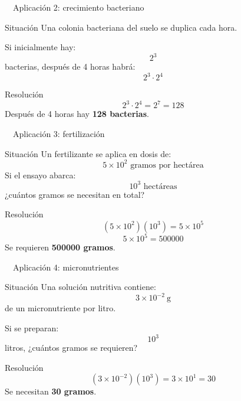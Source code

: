 \documentclass[aspectratio=169,10pt,handout]{beamer}
\newcommand{\pp}{\pause}
\newcommand{\iconoAgro}{\faSeedling}
\begin{document}
	\begin{frame}{\iconoAgro\ \ Aplicación 2: crecimiento bacteriano}
		\begin{block}{Situación}
			Una colonia bacteriana del suelo se duplica cada hora.
			
			Si inicialmente hay:
			\[
			2^3
			\]
			bacterias, después de 4 horas habrá:
			\[
			2^3\cdot2^4
			\]
		\end{block}
		
		\pp
		
		\begin{exampleblock}{Resolución}
			\[
			2^3\cdot2^4 = 2^{7}=128
			\]
			Después de 4 horas hay \textbf{128 bacterias}.
		\end{exampleblock}
	\end{frame}
	
	\begin{frame}{\iconoAgro\ \ Aplicación 3: fertilización}
		\begin{block}{Situación}
			Un fertilizante se aplica en dosis de:
			\[
			5\times10^2 \text{ gramos por hectárea}
			\]
			Si el ensayo abarca:
			\[
			10^3 \text{ hectáreas}
			\]
			¿cuántos gramos se necesitan en total?
		\end{block}
		
		\pp
		
		\begin{exampleblock}{Resolución}
			\[
			(5\times10^2)(10^3)=5\times10^5
			\]
			\[
			5\times10^5=500000
			\]
			Se requieren \textbf{500000 gramos}.
		\end{exampleblock}
	\end{frame}
	
	\begin{frame}{\iconoAgro\ \ Aplicación 4: micronutrientes}
		\begin{block}{Situación}
			Una solución nutritiva contiene:
			\[
			3\times10^{-2}\ \text{g}
			\]
			de un micronutriente por litro.
			
			Si se preparan:
			\[
			10^3
			\]
			litros, ¿cuántos gramos se requieren?
		\end{block}
		
		\pp
		
		\begin{exampleblock}{Resolución}
			\[
			(3\times10^{-2})(10^3)=3\times10^{1}=30
			\]
			Se necesitan \textbf{30 gramos}.
		\end{exampleblock}
	\end{frame}
	
\end{document}
